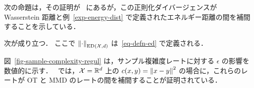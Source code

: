 次の命題は，その証明が~\citep{ramdas2017wasserstein} にあるが，この正則化ダイバージェンスが Wasserstein 距離と例~\ref{exp-energy-dist} で定義されたエネルギー距離の間を補間することを示している．

\begin{prop}
	次が成り立つ．
	ここで $\left\| \cdot \right\|_{\text{ED}(\mathcal{X},d)}$ は~\eqref{eq-defn-ed} で定義される．
\end{prop}

図~\ref{fig-sample-complexity-regul} は，サンプル複雑度レートに対する $\epsilon$ の影響を数値的に示す．~\cite{genevay2018sample} では，$\mathcal{X}=\mathbb{R}^d$ 上の $c(x,y)=\left\| x-y \right\|^2$ の場合に，これらのレートが OT と MMD のレートの間を補間することが証明されている．
